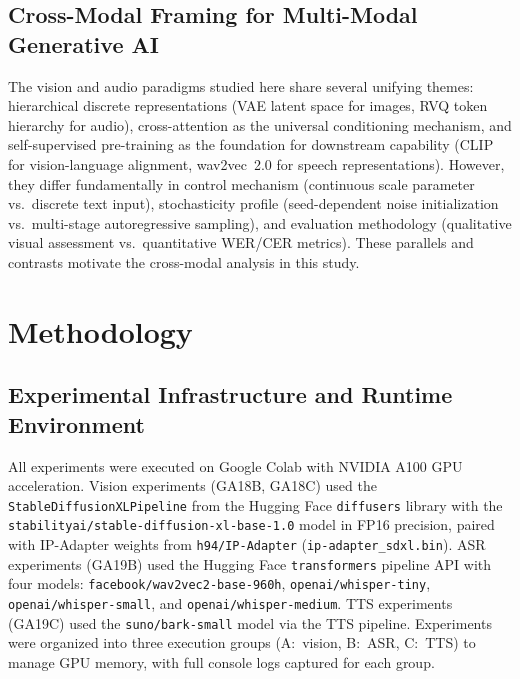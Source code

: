 \documentclass[conference]{IEEEtran}
\newcommand{\ipadapter}{IP-Adapter}
\begin{document}
\subsection{Cross-Modal Framing for Multi-Modal Generative AI}

The vision and audio paradigms studied here share several unifying themes: hierarchical discrete representations (VAE latent space for images, RVQ token hierarchy for audio), cross-attention as the universal conditioning mechanism, and self-supervised pre-training as the foundation for downstream capability (CLIP for vision-language alignment, wav2vec~2.0 for speech representations). However, they differ fundamentally in control mechanism (continuous scale parameter vs.\ discrete text input), stochasticity profile (seed-dependent noise initialization vs.\ multi-stage autoregressive sampling), and evaluation methodology (qualitative visual assessment vs.\ quantitative WER/CER metrics). These parallels and contrasts motivate the cross-modal analysis in this study.

\section{Methodology}
\label{sec:methodology}

\subsection{Experimental Infrastructure and Runtime Environment}

All experiments were executed on Google Colab with NVIDIA A100 GPU acceleration. Vision experiments (GA18B, GA18C) used the \texttt{StableDiffusionXLPipeline} from the Hugging Face \texttt{diffusers} library with the \texttt{stabilityai/stable-diffusion-xl-base-1.0} model in FP16 precision, paired with \ipadapter{} weights from \texttt{h94/IP-Adapter} (\texttt{ip-adapter\_sdxl.bin}). ASR experiments (GA19B) used the Hugging Face \texttt{transformers} pipeline API with four models: \texttt{facebook/wav2vec2-base-960h}, \texttt{openai/whisper-tiny}, \texttt{openai/whisper-small}, and \texttt{openai/whisper-medium}. TTS experiments (GA19C) used the \texttt{suno/bark-small} model via the TTS pipeline. Experiments were organized into three execution groups (A:~vision, B:~ASR, C:~TTS) to manage GPU memory, with full console logs captured for each group.
\end{document}
